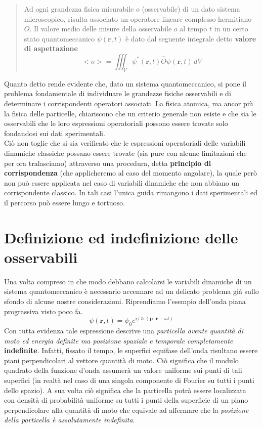\begin{quote}
    Ad ogni grandezza fisica misurabile \(o\) (osservabile) di un dato
    sistema microscopico, risulta associato un operatore lineare complesso
    hermitiano \(O\).
    Il valore medio delle misure della osservabile \(o\)
    al tempo \(t\) in un certo stato quantomeccanico \(\psi(\bm{r},t)\) è
    dato dal seguente integrale detto \textbf{valore di aspettazione}
    \begin{equation}
        \boxed{<o> = \iiint_{V} \psi^{*}(\bm{r},t)\hat{O}\psi(\bm{r},t) \, dV}
        \label{eq:observable-qm-axiom}
    \end{equation}
\end{quote}

Quanto detto rende evidente che, dato un sistema quantomeccanico, si
pone il problema fondamentale di individuare le grandezze fisiche
osservabili e di determinare i corrispondenti operatori associati.
La
fisica atomica, ma ancor più la fisica delle particelle, chiariscono che
un criterio generale non esiste e che sia le osservabili che le loro
espressioni operatoriali possono essere trovate solo fondandosi sui dati
sperimentali.\\
Ciò non toglie che si sia verificato che le espressioni operatoriali
delle variabili dinamiche classiche possano essere trovate (sia pure con
alcune limitazioni che per ora tralasciamo) attraverso una procedura,
detta \textbf{principio di corrispondenza} (che applicheremo al caso del
momento angolare), la quale però non può essere applicata nel caso di
variabili dinamiche che non abbiano un corrispondente classico.
In tali
casi l'unica guida rimangono i dati sperimentali ed il percorso può
essere lungo e tortuoso.

\section{Definizione ed indefinizione delle osservabili}
\label{sec:definizione-ed-indefinizione-delle-osservabili}

Una volta compreso in che modo debbano calcolarsi le variabili dinamiche
di un sistema quantomeccanico è necessario accennare ad un delicato
problema già sullo sfondo di alcune nostre considerazioni.
Riprendiamo
l'esempio dell'onda piana prograssiva visto poco fa. \[
                                                         \psi(\bm{r},t) = \psi_{0}e^{ i/\hslash (\bm{p}\cdot \bm{r}- \omega t)}
\] Con tutta evidenza tale espressione descrive una \emph{particella avente
quantità di moto ed energia definite ma posizione spaziale e temporale
completamente} \textbf{indefinite}.
Infatti, fissato il tempo, le
superfici equifase dell'onda risultano essere piani perpendicolari al
vettore quantità di moto.
Ciò significa che il modulo quadrato della
funzione d'onda assumerà un valore uniforme sui punti di tali superfici
(in realtà nel caso di una singola componente di Fourier su tutti i
punti dello spazio).
A sua volta ciò significa che la particella potrà
essere localizzata con densità di probabilità uniforme su tutti i punti
della superficie di un piano perpendicolare alla quantità di moto che
equivale ad affermare che la \emph{posizione della particella è assolutamente
indefinita}.

